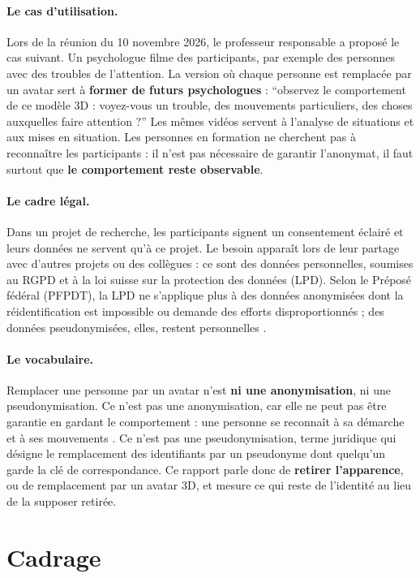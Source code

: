 \documentclass[11pt,a4paper]{report}
\begin{document}
\paragraph{Le cas d'utilisation.} Lors de la réunion du 10 novembre 2026, le professeur responsable a proposé le cas suivant. Un
psychologue filme des participants, par exemple des personnes avec des troubles de l'attention. La version où chaque personne est
remplacée par un avatar sert à \textbf{former de futurs psychologues} : \enquote{observez le comportement de ce modèle 3D :
voyez-vous un trouble, des mouvements particuliers, des choses auxquelles faire attention ?} Les mêmes vidéos servent à l'analyse
de situations et aux mises en situation. Les personnes en formation ne cherchent pas à reconnaître les participants : il n'est pas
nécessaire de garantir l'anonymat, il faut surtout que \textbf{le comportement reste observable}.

\paragraph{Le cadre légal.} Dans un projet de recherche, les participants signent un consentement éclairé et leurs données ne
servent qu'à ce projet. Le besoin apparaît lors de leur partage avec d'autres projets ou des collègues : ce sont des données
personnelles, soumises au RGPD et à la loi suisse sur la protection des données (LPD). Selon le Préposé fédéral (PFPDT), la LPD ne
s'applique plus à des données anonymisées dont la réidentification est impossible ou demande des efforts disproportionnés ; des
données pseudonymisées, elles, restent personnelles \cite{pfpdt_recherche}.

\paragraph{Le vocabulaire.} Remplacer une personne par un avatar n'est \textbf{ni une anonymisation}, ni une pseudonymisation.
Ce n'est pas une anonymisation, car elle ne peut pas être garantie en gardant le comportement : une personne se reconnaît à sa démarche
et à ses mouvements \cite{hanisch2023gait, pantomime2026}. Ce n'est pas une pseudonymisation, terme juridique qui désigne le
remplacement des identifiants par un pseudonyme dont quelqu'un garde la clé de correspondance. Ce rapport parle donc de
\textbf{retirer l'apparence}, ou de remplacement par un avatar 3D, et mesure ce qui reste de l'identité au lieu de la supposer
retirée.

\section{Cadrage}
\end{document}
